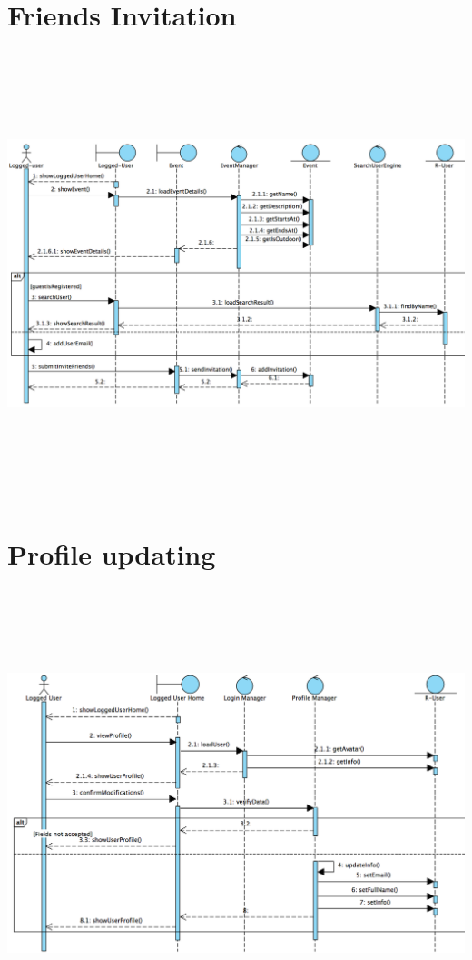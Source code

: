 \documentclass[12pt]{book}
\begin{document}
\section{Friends Invitation}
\vspace{2cm}
\includegraphics[width=18cm,height=13cm]{friendsinvitation_SD}
\newpage
\section{Profile updating}
\vspace{2cm}
\includegraphics[width=18cm,height=13cm]{updateInfo_SD}
\newpage
\end{document}
